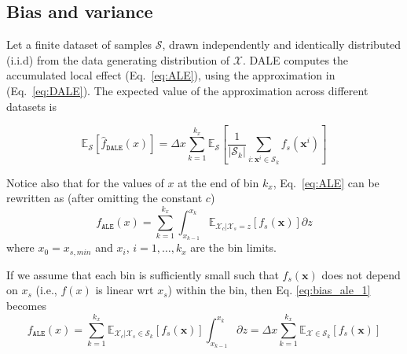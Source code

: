 \documentclass[wcp]{jmlr}
\newcommand{\dale}{\hat{f}_{\mathtt{DALE}}}
\newcommand{\Xcb}{\mathcal{X}_c}
\newcommand{\xb}{\mathbf{x}}
\begin{document}
\subsection{Bias and variance}
\label{sec:4-4-std} Let a finite dataset of samples \(\mathcal{S}\), drawn independently and identically distributed (i.i.d) from the data generating distribution of \(\mathcal{X}\). DALE computes the accumulated local effect (Eq.~\eqref{eq:ALE}), using the approximation in (Eq.~\eqref{eq:DALE}). The expected value of the approximation across different datasets is

\begin{equation} \mathbb{E}_{\mathcal{S}}[\dale(x)] = \Delta x\sum_{k=1}^{k_x}\mathbb{E}_{\mathcal{S}}[\frac{1}{|\mathcal{S}_k|}\sum_{i:\xb^i \in \mathcal{S}_k} f_s(\xb^i)]
  \label{eq:bias_dale}
\end{equation}

\noindent Notice also that for the values of \(x\) at the end of bin \(k_x\), Eq.~\eqref{eq:ALE} can be rewritten as (after omitting the constant \(c\))
\begin{equation} f_{\mathtt{ALE}}(x) = \sum_{k = 1}^{k_x}\int_{x_{k-1}}^{x_k} \mathbb{E}_{\Xcb|\mathcal{X}_s=z}[f_s(\xb)] \partial z
    \label{eq:bias_ale_1}
\end{equation} where \(x_0=x_{s, min}\) and \(x_i\), \(i=1, \dotsc, k_x\) are the bin limits.

\noindent If we assume that each bin is sufficiently small such that \(f_s(\xb)\) does not depend on \(x_s\) (i.e., \(f(x)\) is linear wrt \(x_s\)) within the bin, then Eq. \eqref{eq:bias_ale_1} becomes
\begin{equation} f_{\mathtt{ALE}}(x) = \sum_{k = 1}^{k_x}\mathbb{E}_{\Xcb|\mathcal{X}_s \in \mathcal{S}_k}[f_s(\xb)]\int_{x_{k-1}}^{x_k} \partial z = \Delta x\sum_{k=1}^{k_x}\mathbb{E}_{\mathcal{X} \in \mathcal{S}_k}[f_s(\xb)]
    \label{eq:bias_ale_2}
\end{equation}
\end{document}

